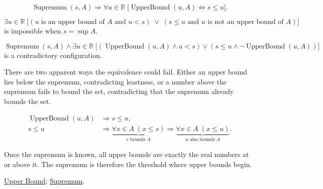 \begin{remark*}
\[
\operatorname{Supremum}(s,A)
\Longrightarrow
\forall u\in\mathbb{R}\;
\bigl[\operatorname{UpperBound}(u,A)\Longleftrightarrow s\le u\bigr].
\]
\end{remark*}

\begin{remark*}
\[
\exists u\in\mathbb{R}\;
\bigl[
(u\text{ is an upper bound of }A\text{ and }u<s)
\;\lor\;
(s\le u\text{ and }u\text{ is not an upper bound of }A)
\bigr]
\]
is impossible when $s=\sup A$.
\end{remark*}

\begin{remark*}
\[
\operatorname{Supremum}(s,A)\land
\exists u\in\mathbb{R}\;
\bigl[
(\operatorname{UpperBound}(u,A)\land u<s)
\lor
(s\le u\land \neg\operatorname{UpperBound}(u,A))
\bigr]
\]
is a contradictory configuration.
\end{remark*}

\begin{remark*}
There are two apparent ways the equivalence could fail. Either an upper bound lies below the supremum, contradicting leastness, or a number above the supremum fails to bound the set, contradicting that the supremum already bounds the set.
\end{remark*}

\begin{remark*}
\[
\begin{aligned}
\operatorname{UpperBound}(u,A)&\Longrightarrow s\le u,\\
s\le u&\Longrightarrow
\underbrace{\forall x\in A\;(x\le s)}_{s\text{ bounds }A}
\Longrightarrow
\underbrace{\forall x\in A\;(x\le u)}_{u\text{ also bounds }A}.
\end{aligned}
\]
\end{remark*}

\begin{remark*}[Interpretation]
Once the supremum is known, all upper bounds are exactly the real numbers at or above it. The supremum is therefore the threshold where upper bounds begin.
\end{remark*}

\begin{remark*}[Dependencies]
\hyperref[def:upper-bound]{Upper Bound};
\hyperref[def:supremum]{Supremum}.
\end{remark*}


